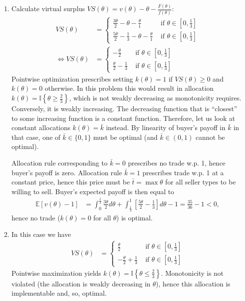 \documentclass[a4paper]{article}
\begin{document}
\begin{enumerate}
	
	\item 
	Calculate virtual surplus $VS(\theta) = v(\theta) - \theta - \frac{F(\theta)}{f(\theta)}$: 
	\begin{align*}
		VS(\theta) &= 
		\begin{cases}
			\frac{3\theta}{2} - \theta - \frac{\theta}{1} &\text{ if } \theta \in [0, \frac{1}{3}]
			\\
			\frac{5\theta}{2} - \frac{1}{3} - \theta - \frac{\theta}{1} &\text{ if } \theta \in [0, \frac{1}{3}]
		\end{cases}
		\\
		\Leftrightarrow
		VS(\theta) &= 
		\begin{cases}
			-\frac{\theta}{2} &\text{ if } \theta \in [0, \frac{1}{3}]
			\\
			\frac{\theta}{2} - \frac{1}{3} &\text{ if } \theta \in [0, \frac{1}{3}]
		\end{cases}
	\end{align*}
	Pointwise optimization prescribes setting $k(\theta) = 1$ if $VS(\theta) \geq 0$ and $k(\theta) = 0$ otherwise. In this problem this would result in allocation $k(\theta) = \mathbb{I} \left\{ \theta \geq \frac{2}{3} \right\}$, which is not weakly decreasing as monotonicity requires.
	Conversely, it is weakly increasing. The decreasing function that is ``closest'' to some increasing function is a constant function.
	Therefore, let us look at constant allocations $k(\theta) = \bar{k}$ instead. By linearity of buyer's payoff in $\bar{k}$ in that case, one of $\bar{k} \in \{0,1\}$ must be optimal (and $\bar{k} \in (0,1)$ cannot be optimal).
	
	Allocation rule corresponding to $\bar{k} = 0$ prescribes no trade w.p. 1, hence buyer's payoff is zero. Allocation rule $\bar{k} = 1$ prescribes trade w.p. 1 at a constant price, hence this price must be $\bar{t} = \max \theta$ for all seller types to be willing to sell. Buyer's expected payoff is then equal to
	\begin{align*}
		\mathbb{E} \left[ v(\theta) - 1 \right] &= \int_0^{\frac{1}{3}} \frac{3\theta}{2} d\theta + \int_{\frac{1}{3}}^{1} \left[ \frac{5 \theta}{2} - \frac{1}{3} \right] d\theta -1 = \frac{35}{36} - 1 < 0,
	\end{align*}
	hence no trade ($k(\theta) = 0$ for all $\theta$) is optimal.
	
	
	\item 	
	In this case we have
	\begin{align*}
		VS(\theta) &= 
		\begin{cases}
			\frac{\theta}{2} &\text{ if } \theta \in [0, \frac{1}{3}]
			\\
			-\frac{\theta}{2} + \frac{1}{3} &\text{ if } \theta \in [0, \frac{1}{3}]
		\end{cases}
	\end{align*}
	Pointwise maximization yields $k(\theta) = \mathbb{I} \left\{ \theta \leq \frac{2}{3} \right\}$. Monotonicity is not violated (the allocation is weakly decreasing in $\theta$), hence this allocation is implementable and, so, optimal.
\end{enumerate}
\fi
\end{document}
